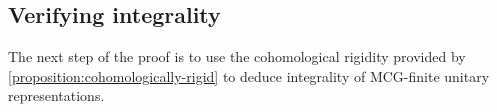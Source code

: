 \documentclass[12 pt]{amsart}
\theoremstyle{plain}
\theoremstyle{definition}
\theoremstyle{remark}
\numberwithin{equation}{section}
\begin{document}
%
%
\subsection{Verifying integrality}
\label{subsection:integrality}

The next step of the proof is to use the cohomological rigidity provided by
\autoref{proposition:cohomologically-rigid} to deduce integrality of MCG-finite unitary representations.
\end{document}
